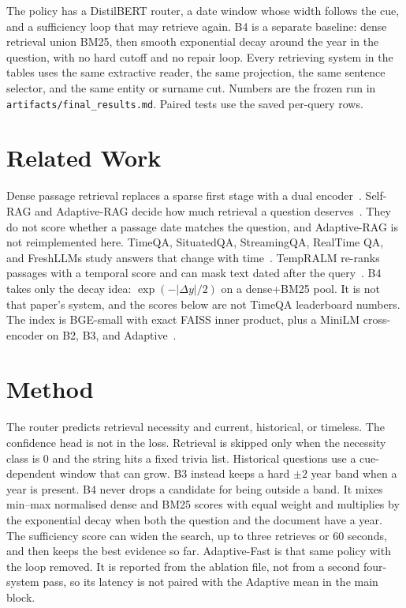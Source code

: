 \documentclass[sigconf,anonymous,review]{acmart}
\begin{document}
The policy has a DistilBERT router, a date window whose width follows the cue, and a sufficiency loop that may retrieve again.
B4 is a separate baseline: dense retrieval union BM25, then smooth exponential decay around the year in the question, with no hard cutoff and no repair loop.
Every retrieving system in the tables uses the same extractive reader, the same projection, the same sentence selector, and the same entity or surname cut.
Numbers are the frozen run in \texttt{artifacts/final\_results.md}.
Paired tests use the saved per-query rows.

\section{Related Work}

Dense passage retrieval replaces a sparse first stage with a dual encoder~\cite{karpukhin2020dpr}.
Self-RAG and Adaptive-RAG decide how much retrieval a question deserves~\cite{asai2024selfrag,jeong2024adaptiverag}.
They do not score whether a passage date matches the question, and Adaptive-RAG is not reimplemented here.
TimeQA, SituatedQA, StreamingQA, RealTime QA, and FreshLLMs study answers that change with time~\cite{chen2021timeqa,zhang2021situatedqa,liska2022streamingqa,kasai2023realtimeqa,vu2023freshqa}.
TempRALM re-ranks passages with a temporal score and can mask text dated after the query~\cite{gade2024tempralm}.
B4 takes only the decay idea: $\exp(-|\Delta y|/2)$ on a dense+BM25 pool.
It is not that paper's system, and the scores below are not TimeQA leaderboard numbers.
The index is BGE-small with exact FAISS inner product, plus a MiniLM cross-encoder on B2, B3, and Adaptive~\cite{xiao2024cpack,johnson2019faiss,wang2020minilm}.

\section{Method}

The router predicts retrieval necessity and current, historical, or timeless.
The confidence head is not in the loss.
Retrieval is skipped only when the necessity class is 0 and the string hits a fixed trivia list.
Historical questions use a cue-dependent window that can grow.
B3 instead keeps a hard $\pm 2$ year band when a year is present.
B4 never drops a candidate for being outside a band.
It mixes min--max normalised dense and BM25 scores with equal weight and multiplies by the exponential decay when both the question and the document have a year.
The sufficiency score can widen the search, up to three retrieves or 60 seconds, and then keeps the best evidence so far.
Adaptive-Fast is that same policy with the loop removed.
It is reported from the ablation file, not from a second four-system pass, so its latency is not paired with the Adaptive mean in the main block.
\end{document}
